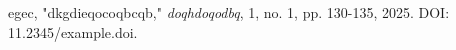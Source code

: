 \documentclass[11pt]{article}
\begin{document}
\fontsize{11pt}{13.2pt}\selectfont
egec, "dkgdieqocoqbcqb," \textit{doqhdoqodbq}, 1, no. 1, pp. 130-135, 2025. DOI: 11.2345/example.doi.
\end{document}
